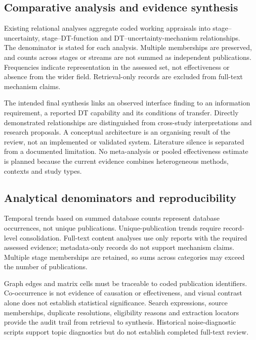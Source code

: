 \subsection{Comparative analysis and evidence synthesis}
Existing relational analyses aggregate coded working appraisals into stage--uncertainty, stage--DT-function and DT--uncertainty-mechanism relationships. The denominator is stated for each analysis. Multiple memberships are preserved, and counts across stages or streams are not summed as independent publications. Frequencies indicate representation in the assessed set, not effectiveness or absence from the wider field. Retrieval-only records are excluded from full-text mechanism claims.

The intended final synthesis links an observed interface finding to an information requirement, a reported DT capability and its conditions of transfer. Directly demonstrated relationships are distinguished from cross-study interpretations and research proposals. A conceptual architecture is an organising result of the review, not an implemented or validated system. Literature silence is separated from a documented limitation. No meta-analysis or pooled effectiveness estimate is planned because the current evidence combines heterogeneous methods, contexts and study types.


\subsection{Analytical denominators and reproducibility}
Temporal trends based on summed database counts represent database occurrences, not unique publications. Unique-publication trends require record-level consolidation. Full-text content analyses use only reports with the required assessed evidence; metadata-only records do not support mechanism claims. Multiple stage memberships are retained, so sums across categories may exceed the number of publications.

Graph edges and matrix cells must be traceable to coded publication identifiers. Co-occurrence is not evidence of causation or effectiveness, and visual contrast alone does not establish statistical significance. Search expressions, source memberships, duplicate resolutions, eligibility reasons and extraction locators provide the audit trail from retrieval to synthesis. Historical noise-diagnostic scripts support topic diagnostics but do not establish completed full-text review.

